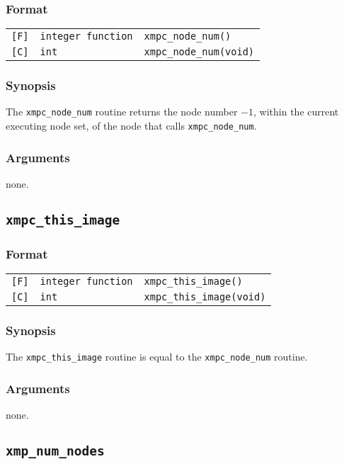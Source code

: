 \subsubsection*{Format}

\begin{tabular}{lll}
\verb![F]!&  {\tt integer function}& {\tt xmpc\_node\_num()}\\
\verb![C]!&  {\tt int}& {\tt xmpc\_node\_num(void)}
\end{tabular}

\subsubsection*{Synopsis}
The {\tt xmpc\_node\_num} routine returns the node number $- 1$,
within the current executing node set, of the node that calls {\tt xmpc\_node\_num}.

\subsubsection*{Arguments}
none.

\subsection{\tt xmpc\_this\_image}\label{sub:xmpcthisimage}

\subsubsection*{Format}

\begin{tabular}{lll}
\verb![F]!&  {\tt integer function}& {\tt xmpc\_this\_image()}\\
\verb![C]!&  {\tt int}& {\tt xmpc\_this\_image(void)}
\end{tabular}

\subsubsection*{Synopsis}
The {\tt xmpc\_this\_image} routine is equal to the {\tt xmpc\_node\_num} routine.

\subsubsection*{Arguments}
none.

\subsection{\tt xmp\_num\_nodes}

